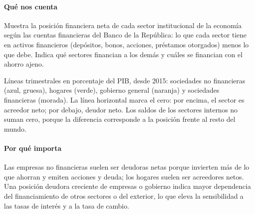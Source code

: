 \paragraph{Qué nos cuenta}
Muestra la posición financiera neta de cada sector institucional de la economía según las cuentas financieras del Banco de la República: lo que cada sector tiene en activos financieros (depósitos, bonos, acciones, préstamos otorgados) menos lo que debe. Indica qué sectores financian a los demás y cuáles se financian con el ahorro ajeno.

\begin{leer}
Líneas trimestrales en porcentaje del PIB, desde 2015: sociedades no financieras (azul, gruesa), hogares (verde), gobierno general (naranja) y sociedades financieras (morada). La línea horizontal marca el cero: por encima, el sector es acreedor neto; por debajo, deudor neto. Los saldos de los sectores internos no suman cero, porque la diferencia corresponde a la posición frente al resto del mundo.
\end{leer}

\paragraph{Por qué importa}
Las empresas no financieras suelen ser deudoras netas porque invierten más de lo que ahorran y emiten acciones y deuda; los hogares suelen ser acreedores netos. Una posición deudora creciente de empresas o gobierno indica mayor dependencia del financiamiento de otros sectores o del exterior, lo que eleva la sensibilidad a las tasas de interés y a la tasa de cambio.

